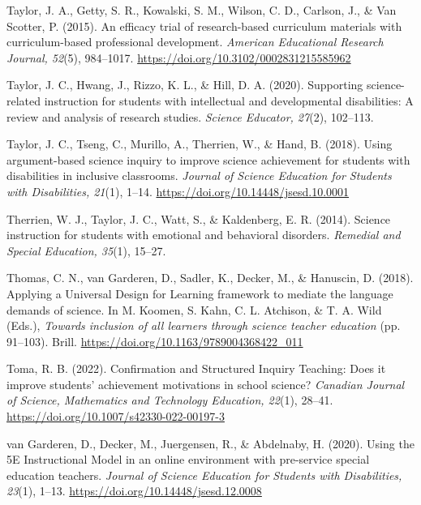 \documentclass[11.5pt]{sig-alternate} %
\begin{document}
Taylor, J. A., Getty, S. R., Kowalski, S. M., Wilson, C. D., Carlson, J., \& Van Scotter, P. (2015). An efficacy trial of research-based curriculum materials with curriculum-based professional development. \textit{American Educational Research Journal, 52}(5), 984–1017. \url{https://doi.org/10.3102/0002831215585962}

Taylor, J. C., Hwang, J., Rizzo, K. L., \& Hill, D. A. (2020). Supporting science-related instruction for students with intellectual and developmental disabilities: A review and analysis of research studies. \textit{Science Educator, 27}(2), 102–113.

Taylor, J. C., Tseng, C., Murillo, A., Therrien, W., \& Hand, B. (2018). Using argument-based science inquiry to improve science achievement for students with disabilities in inclusive classrooms. \textit{Journal of Science Education for Students with Disabilities, 21}(1), 1–14. \url{https://doi.org/10.14448/jsesd.10.0001}

Therrien, W. J., Taylor, J. C., Watt, S., \& Kaldenberg, E. R. (2014). Science instruction for students with emotional and behavioral disorders. \textit{Remedial and Special Education, 35}(1), 15–27.

Thomas, C. N., van Garderen, D., Sadler, K., Decker, M., \& Hanuscin, D. (2018). Applying a Universal Design for Learning framework to mediate the language demands of science. In M. Koomen, S. Kahn, C. L. Atchison, \& T. A. Wild (Eds.), \textit{Towards inclusion of all learners through science teacher education} (pp. 91–103). Brill. \url{https://doi.org/10.1163/9789004368422_011}

Toma, R. B. (2022). Confirmation and Structured Inquiry Teaching: Does it improve students’ achievement motivations in school science? \textit{Canadian Journal of Science, Mathematics and Technology Education, 22}(1), 28–41. \url{https://doi.org/10.1007/s42330-022-00197-3}

van Garderen, D., Decker, M., Juergensen, R., \& Abdelnaby, H. (2020). Using the 5E Instructional Model in an online environment with pre-service special education teachers. \textit{Journal of Science Education for Students with Disabilities, 23}(1), 1–13. \url{https://doi.org/10.14448/jsesd.12.0008}
\end{document}
